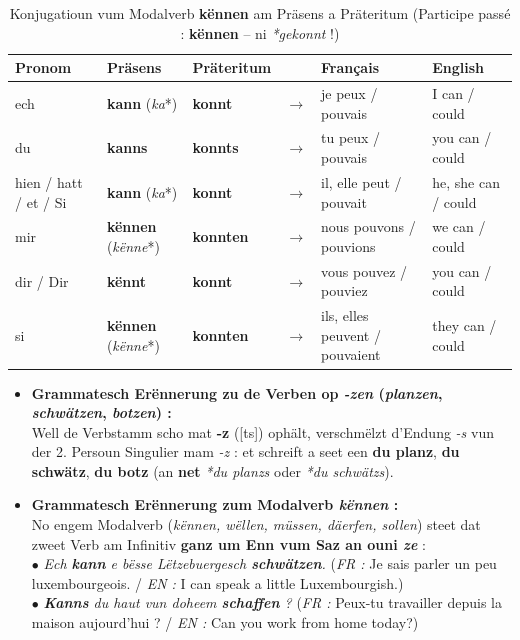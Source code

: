 \begin{table}[htbp]
    \centering
    \small
    \begin{tabular}{lll c l l}
        \toprule
        \textbf{Pronom} & \textbf{Präsens} & \textbf{Präteritum} & & \textbf{Français} & \textbf{English} \\
        \midrule
        ech & \textbf{kann} (\textit{ka}*) & \textbf{konnt} & $\rightarrow$ & je peux / pouvais & I can / could \\
        du & \textbf{kanns} & \textbf{konnts} & $\rightarrow$ & tu peux / pouvais & you can / could \\
        hien / hatt / et / Si & \textbf{kann} (\textit{ka}*) & \textbf{konnt} & $\rightarrow$ & il, elle peut / pouvait & he, she can / could \\
        \midrule
        mir & \textbf{kënnen} (\textit{kënne}*) & \textbf{konnten} & $\rightarrow$ & nous pouvons / pouvions & we can / could \\
        dir / Dir & \textbf{kënnt} & \textbf{konnt} & $\rightarrow$ & vous pouvez / pouviez & you can / could \\
        si & \textbf{kënnen} (\textit{kënne}*) & \textbf{konnten} & $\rightarrow$ & ils, elles peuvent / pouvaient & they can / could \\
        \bottomrule
    \end{tabular}
    \caption{Konjugatioun vum Modalverb \textbf{kënnen} am Präsens a Präteritum (Participe passé : \textbf{kënnen} -- ni \textit{*gekonnt} !)}
\end{table}

\begin{itemize}
    \item \textbf{Grammatesch Erënnerung zu de Verben op \textit{-zen} (\textit{planzen}, \textit{schwätzen}, \textit{botzen}) :} \\
    Well de Verbstamm scho mat \textbf{-z} ({[ts]}) ophält, verschmëlzt d'Endung \textit{-s} vun der 2. Persoun Singulier mam \textit{-z} : et schreift a seet een \textbf{du planz}, \textbf{du schwätz}, \textbf{du botz} (an \textbf{net} \textit{*du planzs} oder \textit{*du schwätzs}).
    \item \textbf{Grammatesch Erënnerung zum Modalverb \textit{kënnen} :} \\
    No engem Modalverb (\textit{kënnen, wëllen, müssen, däerfen, sollen}) steet dat zweet Verb am Infinitiv \textbf{ganz um Enn vum Saz an ouni \textit{ze}} : \\
    $\bullet$ \textit{Ech \textbf{kann} e bësse Lëtzebuergesch \textbf{schwätzen}.} (\textit{FR :} Je sais parler un peu luxembourgeois. / \textit{EN :} I can speak a little Luxembourgish.) \\
    $\bullet$ \textit{\textbf{Kanns} du haut vun doheem \textbf{schaffen} ?} (\textit{FR :} Peux-tu travailler depuis la maison aujourd'hui ? / \textit{EN :} Can you work from home today?)
\end{itemize}


